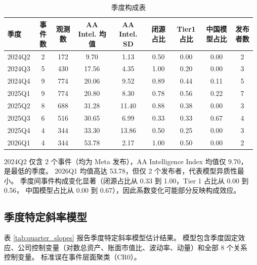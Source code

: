 \documentclass[11pt,fontset=fandol,a4paper]{ctexart}
\begin{document}
\begin{table}[htbp]
\centering
\caption{季度构成表}
\label{tab:quarter_comp}
\small
\begin{tabular}{lcccccccc}
\toprule
季度 & 事件数 & 观测数 & AA Intel. 均值 & AA Intel. SD & 闭源占比 & Tier1占比 & 中国模型占比 & 发布者数 \\
\midrule
2024Q2 & 2  &  172 & 9.70  & 1.13  & 0.50 & 0.00 & 0.00 & 2 \\
2024Q3 & 5  &  430 & 17.56 & 4.35  & 1.00 & 0.20 & 0.00 & 3 \\
2024Q4 & 9  &  774 & 20.06 & 9.52  & 0.89 & 0.44 & 0.11 & 5 \\
2025Q1 & 9  &  774 & 20.80 & 8.30  & 0.78 & 0.56 & 0.22 & 7 \\
2025Q2 & 8  &  688 & 31.28 & 11.40 & 0.88 & 0.38 & 0.00 & 3 \\
2025Q3 & 6  &  516 & 30.65 & 6.99  & 0.33 & 0.33 & 0.67 & 4 \\
2025Q4 & 4  &  344 & 33.30 & 13.86 & 0.50 & 0.25 & 0.00 & 3 \\
2026Q1 & 4  &  344 & 53.78 & 2.17  & 1.00 & 0.50 & 0.00 & 2 \\
\bottomrule
\end{tabular}
\end{table}

2024Q2 仅含 2 个事件（均为 Meta 发布），AA Intelligence Index 均值仅 9.70，是最低的季度。
2026Q1 均值高达 53.78，但仅 2 个发布者，代表模型异质性最小。
季度间事件构成变化显著（闭源占比从 0.33 到 1.00，Tier 1 占比从 0.00 到 0.56，
中国模型占比从 0.00 到 0.67），因此系数变化可能部分反映构成效应。

\subsection{季度特定斜率模型}

表 \ref{tab:quarter_slopes} 报告季度特定斜率模型估计结果。
模型包含季度固定效应、公司控制变量（对数总资产、账面市值比、波动率、动量）和全部 8 个关系控制变量。
标准误在事件层面聚类（CR0）。
\end{document}
